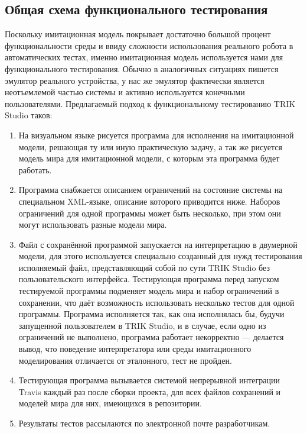 \documentclass[conference]{IEEEtran}
\begin{document}
\subsection{Общая схема функционального тестирования}
Поскольку имитационная модель покрывает достаточно большой процент функциональности 
среды и ввиду сложности использования реального робота в автоматических тестах, именно 
имитационная модель используется нами для функционального тестирования. Обычно в аналогичных 
ситуациях пишется эмулятор реального устройства, у нас же эмулятор фактически является 
неотъемлемой частью системы и активно используется конечными пользователями. Предлагаемый 
подход к функциональному тестированию TRIK Studio таков:
\begin{enumerate}
	\item На визуальном языке рисуется программа для исполнения на имитационной модели, 
			решающая ту или иную практическую задачу, а так же рисуется модель мира для 
			имитационной модели, с которым эта программа будет работать.
	\item Программа снабжается описанием ограничений на состояние системы на специальном 
			XML-языке, описание которого приводится ниже. Наборов ограничений для одной 
			программы может быть несколько, при этом они могут использовать разные модели мира.
	\item Файл с сохранённой программой запускается на интерпретацию в двумерной модели, 
			для этого используется специально созданный для нужд тестирования исполняемый 
			файл, представляющий собой по сути TRIK Studio без пользовательского интерфейса. 
			Тестирующая программа перед запуском тестируемой программы подменяет модель мира 
			и набор ограничений в сохранении, что даёт возможность использовать несколько 
			тестов для одной программы. Программа исполняется так, как она исполнялась бы, 
			будучи запущенной пользователем в TRIK Studio, и в случае, если одно из ограничений 
			не выполнено, программа работает некорректно --- делается вывод, что поведение 
			интерпретатора или среды имитационного моделирования отличается от эталонного, 
			тест не пройден.
	\item Тестирующая программа вызывается системой непрерывной интеграции Travis каждый 
			раз после сборки проекта, для всех файлов сохранений и моделей мира для них, 
			имеющихся в репозитории.
	\item Результаты тестов рассылаются по электронной почте разработчикам.
\end{enumerate}
\end{document}
